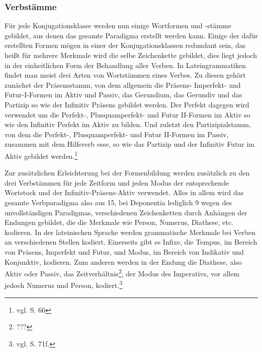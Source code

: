 \subsubsection{Verbstämme}
Für jede Konjugationsklasse werden nun einige Wortformen und -stämme gebildet, aus denen das gesamte Paradigma erstellt werden kann. Einige der dafür erstellten Formen mögen in einer der Konjugationsklassen redundant sein, das heißt für mehrere Merkmale wird die selbe Zeichenkette gebildet, dies liegt jedoch in der einheitlichen Form der Behandlung aller Verben. In Lateingrammatiken findet man meist drei Arten von Wortstämmen eines Verbes. Zu diesen gehört zunächst der Präsensstamm, von dem allgemein die Präsens- Imperfekt- und Futur-I-Formen im Aktiv und Passiv, das Gerundium, das Gerundiv und das Partizip so wie der Infinitiv Präsens gebildet werden. Der Perfekt dagegen wird verwendet um die Perfekt-, Plusquamperfekt- und Futur II-Formen im Aktiv so wie den Infinitiv Perfekt im Aktiv zu bilden. Und zuletzt den Partizipialstamm, von dem die Perfekt-, Plusquamperfekt- und Futur II-Formen im Passiv, zusammen mit dem Hilfsverb esse, so wie das Partizip und der Infinitiv Futur im Aktiv gebildet werden.\footnote{vgl. \cite{BAYER-LINDAUER1994} S. 66} \par
Zur zusätzlichen Erleichterung bei der Formenbildung werden zusätzlich zu den drei Verbstämmen für jede Zeitform und jeden Modus der entsprechende Wortstock und der Infinitiv-Präsens-Aktiv verwendet. Alles in allem wird das gesamte Verbparadigma also aus 15, bei Deponentia lediglich 9 wegen des unvollständigen Paradigmas, verschiedenen Zeichenketten durch Anhängen der Endungen gebildet, die die Merkmale wie Person, Numerus, Diathese, etc. kodieren. In der lateinischen Sprache werden grammatische Merkmale bei Verben an verschiedenen Stellen kodiert. Einerseits gibt es Infixe, die Tempus, im Bereich von Präsens, Imperfekt und Futur, und Modus, im Bereich von Indikativ und Konjunktiv, kodieren. Zum anderen werden in der Endung die Diathese, also Aktiv oder Passiv, das Zeitverhältnis\footnote{???}, der Modus des Imperativs, vor allem jedoch Numerus und Person, kodiert.\footnote{vgl. \cite{BAYER-LINDAUER1994} S. 71f.} \par

